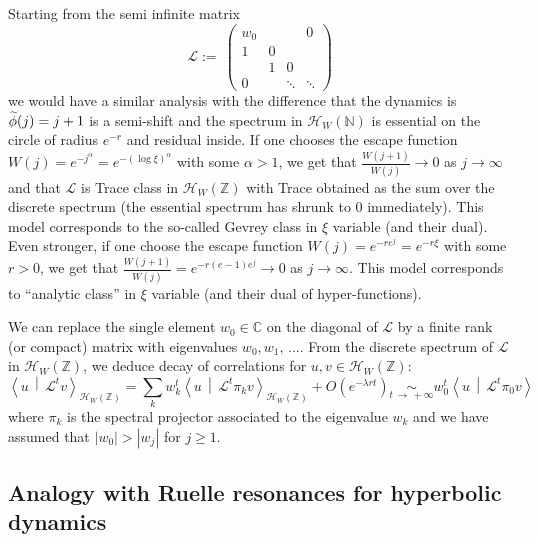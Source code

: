 \documentclass[AHL,Unicode,longabstracts,published]{cedram}
\newcommand{\clH}{\mathcal{H}}
\newcommand{\clL}{\mathcal{L}}
\newcommand{\bbC}{\mathbb{C}}
\newcommand{\bbZ}{\mathbb{Z}}
\newcommand{\bbN}{\mathbb{N}}
\let\oldtilde\tilde
\renewcommand*{\tilde}[1]{\mathchoice{\widetilde{#1}}{\widetilde{#1}}{\oldtilde{#1}}{\oldtilde{#1}}}
\newcommand{\clH}{\mathcal{H}}
\begin{document}
\begin{rema}
Starting from the semi infinite matrix
\[
\clL:=\
\begin{pmatrix}
w_{0} & & & 0\\
1 & 0\\
& 1 & 0\\
0 & & \ddots & \ddots
\end{pmatrix}
\]
we would have a similar analysis with the difference that the dynamics is $\tilde{\phi}(j)=j+1$ is a semi-shift and the spectrum in $\clH _{W}(\bbN)$ is essential on the circle of radius $e^{-r}$ and residual inside. If one chooses the escape function $W(j)=e^{-j^{\alpha}}=e^{-(\log\xi)^{\alpha}}$ with some $\alpha>1$, we get that $\frac{W(j+1)}{W(j)}\rightarrow0$ as $j\rightarrow\infty$ and that $\clL$ is Trace class in $\clH _{W}(\bbZ)$ with Trace obtained as the sum over the discrete spectrum (the essential spectrum has shrunk to $0$ immediately). This model corresponds to the so-called Gevrey class in $\xi$ variable (and their dual). Even stronger, if one choose the escape function $W\left(j\right)=e^{-re^{j}}=e^{-r\xi}$ with some $r>0$, we get that $\frac{W(j+1)}{W(j)}=e^{-r(e-1)e^{j}}\rightarrow0$ as $j\rightarrow\infty$. This model corresponds to ``analytic class'' in $\xi$ variable (and their dual of hyper-functions).
\end{rema}


\begin{rema}
We can replace the single element $w_{0}\in\bbC$ on the diagonal of $\clL$ by a finite rank (or compact) matrix with eigenvalues $w_{0},w_{1},\,\ldots$. From the discrete spectrum of $\clL$ in $\clH _{W}(\bbZ)$, we deduce decay of correlations for $u,v\in\clH _{W}(\bbZ)$:
\[
\left\langle u\,\middle|\,\clL^{t}v\right\rangle_{\clH _{W}\left(\bbZ\right)}=\sum_{k}w_{k}^{t}\left\langle u\,\middle|\,\clL^{t}\pi_{k}v\right\rangle_{\clH _{W}\left(\bbZ\right)}+O\left(e^{-\lambda rt}\right)\underset{t\,\rightarrow\,+\infty}{\sim}w_{0}^{t}\left\langle u\,\middle|\,\clL^{t}\pi_{0}v\right\rangle
\]
where $\pi_{k}$ is the spectral projector associated to the eigenvalue $w_{k}$ and we have assumed that $|w_{0}|>|w_{j}|$ for $j\geq1$.
\end{rema}


\subsection{Analogy with Ruelle resonances for hyperbolic dynamics}
\end{document}
